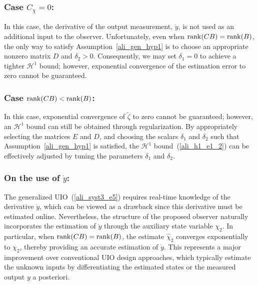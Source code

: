 \documentclass{ifacconf}
\def\eqref#1{(\ref{#1})}
\def\rank{\mathop{{\rm rank}}}
\def\rank{\mathop{{\rm rank}}}
\begin{document}
{%
\subsubsection{Case $C_{\chi} = 0$:}
%
\vspace*{-0.2cm}
%
In this case, the derivative of the output measurement, $\dot{y}$, is not used as an additional input to the observer. Unfortunately, even when $\rank(CB) = \rank(B)$, the only way to satisfy Assumption~\ref{ali_gen_hyp1} is to choose an appropriate nonzero matrix $D$ and $\delta_{2} > 0$. Consequently, we may set $\delta_{1} = 0$ to achieve a tighter $\mathcal{H}^{1}$ bound; however, exponential convergence of the estimation error to zero cannot be guaranteed.

\subsubsection{Case $\rank(CB) < \rank(B)$:}
%
In this case, exponential convergence of $\tilde{\zeta}$ to zero cannot be guaranteed; however, an $\mathcal{H}^{1}$ bound can still be obtained through regularization. By appropriately selecting the matrices $E$ and $D$, and choosing the scalars $\delta_{1}$ and $\delta_{2}$ such that Assumption~\ref{ali_gen_hyp1} is satisfied, the $\mathcal{H}^{1}$ bound~\eqref{ali_h1_e1_2} can be effectively adjusted by tuning the parameters $\delta_{1}$ and $\delta_{2}$.

\subsubsection{On the use of $\dot{y}$:}
%
\vspace*{-0.2cm}
%
The generalized UIO~\eqref{ali_syst3_e5} requires real-time knowledge of the derivative $\dot{y}$, which can be viewed as a drawback since this derivative must be estimated online. Nevertheless, the structure of the proposed observer naturally incorporates the estimation of $\dot{y}$ through the auxiliary state variable $\chi_{2}$. In particular, when $\rank(CB) = \rank(B)$, the estimate $\hat{\chi}_{2}$ converges exponentially to $\chi_{2}$, thereby providing an accurate estimation of $\dot{y}$. This represents a major improvement over conventional UIO design approaches, which typically estimate the unknown inputs by differentiating the estimated states or the measured output $y$ a posteriori.


}
\end{document}
